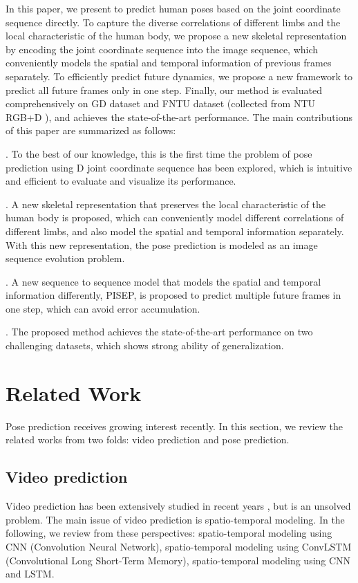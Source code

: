 \documentclass[journal]{IEEEtran}
\begin{document}
In this paper, we present to predict human poses based on the joint coordinate sequence directly. To capture the diverse correlations of different limbs and the local characteristic of the human body, we propose a new skeletal representation by encoding the joint coordinate sequence into the image sequence, which conveniently models the spatial and temporal information of previous frames separately. To efficiently predict future dynamics, we propose a new framework to predict all future frames only in one step. Finally, our method is evaluated comprehensively on GD \cite{g3d} dataset and FNTU dataset (collected from NTU RGB+D \cite{AmirNTU}), and achieves the state-of-the-art performance.
The main contributions of this paper are summarized as follows:

. To the best of our knowledge, this is the first time the problem of pose prediction using D joint coordinate sequence has been explored, which is intuitive and efficient to evaluate and visualize its performance.

. A new skeletal representation that preserves the local characteristic of the human body is proposed, which can conveniently model different correlations of different limbs, and also model the spatial and temporal information separately. With this new representation, the pose prediction is modeled as an image sequence evolution problem.

. A new sequence to sequence model that models the spatial and temporal information differently, PISEP, is proposed to predict multiple future frames in one step, which can avoid error accumulation.

. The proposed method achieves the state-of-the-art performance on two challenging datasets, which shows strong ability of generalization.


\section{Related Work}
Pose prediction receives growing interest recently. In this section, we review the related works from two folds: video prediction and pose prediction.

\subsection{Video prediction}

Video prediction has been extensively studied in recent years \cite{dpcvpul,ostdfvp,fdtvp,pfuvp,dmspms}, but is an unsolved problem. The main issue of video prediction is spatio-temporal modeling. In the following, we review from these perspectives: spatio-temporal modeling using CNN (Convolution Neural Network), spatio-temporal modeling using ConvLSTM (Convolutional Long Short-Term Memory), spatio-temporal modeling using CNN and LSTM.
\end{document}
